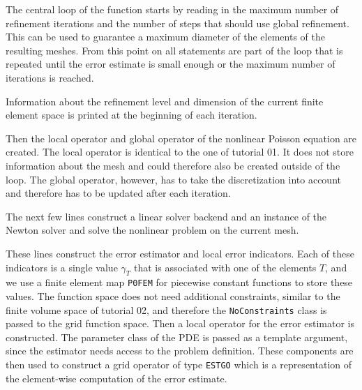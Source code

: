 \documentclass[a4paper,12pt]{article}
\begin{document}

The central loop of the function starts by reading in the maximum number of refinement
iterations and the number of steps that should use global refinement. This can be used to
guarantee a maximum diameter of the elements of the resulting meshes. From this point on all
statements are part of the loop that is repeated until the error estimate is small enough
or the maximum number of iterations is reached.


Information about the refinement level and dimension of the current finite element space is
printed at the beginning of each iteration.


Then the local operator and global operator of the nonlinear Poisson equation are created.
The local operator is identical to the one of tutorial 01. It does not store information
about the mesh and could therefore also be created outside of the loop. The global operator,
however, has to take the discretization into account and therefore has to be updated after
each iteration.


The next few lines construct a linear solver backend and an instance of the Newton solver
and solve the nonlinear problem on the current mesh.


These lines construct the error estimator and local error indicators. Each of these
indicators is a single value $\gamma_T$ that is associated with one of the elements $T$,
and we use a finite element map \lstinline{P0FEM} for piecewise constant functions to
store these values. The function space does not need additional constraints, similar to
the finite volume space of tutorial 02, and therefore the \lstinline{NoConstraints} class
is passed to the grid function space. Then a local operator for the error estimator is
constructed. The parameter class of the PDE is passed as a template argument, since the
estimator needs access to the problem definition. These components are then used to
construct a grid operator of type \lstinline{ESTGO} which is a representation of the
element-wise computation of the error estimate.
\end{document}
